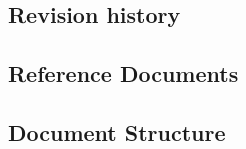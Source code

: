 \subsection{Revision history}

\subsection{Reference Documents}

\subsection{Document Structure}



\clearpage